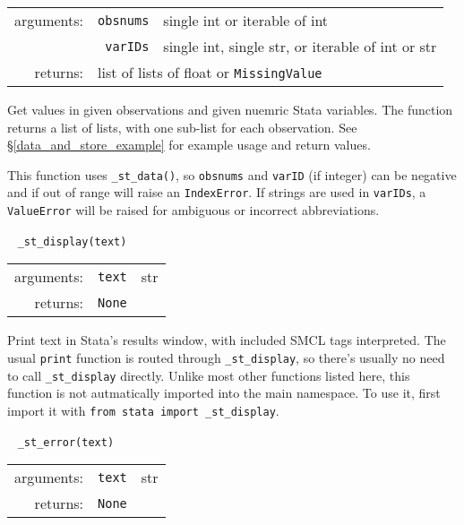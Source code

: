 \documentclass{article}
\begin{document}
			\vspace{1.5mm}
			\noindent 
			\indent \begin{tabular}{rrl}
					arguments: & \texttt{obsnums} & single int or iterable of int \\
					  & \texttt{varIDs} & single int, single str, or iterable of int or str \\
					returns: & \multicolumn{2}{l}{list of lists of float or \lstinline$MissingValue$}
				\end{tabular}
								
			\vspace{1.5mm}
			\noindent Get values in given observations and given nuemric Stata variables. The function returns a list of lists, with one sub-list for each observation. See \S\ref{data_and_store_example} for example usage and return values. 
			
			This function uses \lstinline{_st_data()}, so \lstinline{obsnums} and \lstinline{varID} (if integer) can be negative and if out of range will raise an \lstinline{IndexError}. If strings are used in \lstinline{varIDs}, a \lstinline{ValueError} will be raised for ambiguous or incorrect abbreviations. \newline
		
		
			\ \newline
			\noindent \lstinline$_st_display(text)$
								
			\vspace{1.5mm}
			\noindent 
			\indent \begin{tabular}{rrl}
					arguments: & \texttt{text} & str \\
					returns: & \multicolumn{2}{l}{\texttt{None}}
				\end{tabular}
								
			\vspace{1.5mm}
			\noindent Print text in Stata's results window, with included \textsc{SMCL} tags interpreted. The usual \texttt{print} function is routed through \lstinline$_st_display$, so there's usually no need to call \lstinline$_st_display$ directly.  Unlike most other functions listed here, this function is not autmatically imported into the main namespace. To use it, first import it with \lstinline{from stata import _st_display}. \newline
			
			
			\ \newline
			\noindent \lstinline$_st_error(text)$
								
			\vspace{1.5mm}
			\noindent
			\indent \begin{tabular}{rrl}
					arguments: & \texttt{text} & str \\
					returns: & \multicolumn{2}{l}{\texttt{None}}
				\end{tabular}
								
\end{document}
